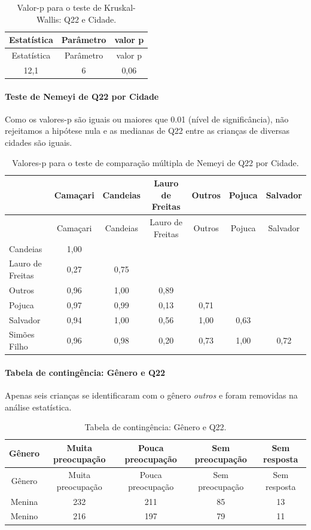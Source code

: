 \documentclass[]{article}
\let\oldparagraph\paragraph
\renewcommand{\paragraph}[1]{\oldparagraph{#1}\mbox{}}
\begin{document}
\begin{longtable}[]{@{}ccc@{}}
\caption{\label{tab:unnamed-chunk-491}Valor-p para o teste de Kruskal-Wallis: Q22 e Cidade.}\tabularnewline
\toprule
Estatística & Parâmetro & valor p\tabularnewline
\midrule
\endfirsthead
\toprule
Estatística & Parâmetro & valor p\tabularnewline
\midrule
\endhead
12,1 & 6 & 0,06\tabularnewline
\bottomrule
\end{longtable}

\hypertarget{teste-de-nemeyi-de-q22-por-cidade}{%
\paragraph{Teste de Nemeyi de Q22 por Cidade}\label{teste-de-nemeyi-de-q22-por-cidade}}

Como os valores-p são iguais ou maiores que 0.01 (nível de significância), não rejeitamos a hipótese nula e as medianas de Q22 entre as crianças de diversas cidades são iguais.

\begin{longtable}[]{@{}lcccccc@{}}
\caption{\label{tab:unnamed-chunk-493}Valores-p para o teste de comparação múltipla de Nemeyi de Q22 por Cidade.}\tabularnewline
\toprule
& Camaçari & Candeias & Lauro de Freitas & Outros & Pojuca & Salvador\tabularnewline
\midrule
\endfirsthead
\toprule
& Camaçari & Candeias & Lauro de Freitas & Outros & Pojuca & Salvador\tabularnewline
\midrule
\endhead
Candeias & 1,00 & & & & &\tabularnewline
Lauro de Freitas & 0,27 & 0,75 & & & &\tabularnewline
Outros & 0,96 & 1,00 & 0,89 & & &\tabularnewline
Pojuca & 0,97 & 0,99 & 0,13 & 0,71 & &\tabularnewline
Salvador & 0,94 & 1,00 & 0,56 & 1,00 & 0,63 &\tabularnewline
Simões Filho & 0,96 & 0,98 & 0,20 & 0,73 & 1,00 & 0,72\tabularnewline
\bottomrule
\end{longtable}

\cleardoublepage

\hypertarget{tabela-de-continguxeancia-guxeanero-e-q22}{%
\paragraph{Tabela de contingência: Gênero e Q22}\label{tabela-de-continguxeancia-guxeanero-e-q22}}

Apenas seis crianças se identificaram com o gênero \emph{outros} e foram removidas na análise estatística.

\begin{longtable}[]{@{}ccccc@{}}
\caption{\label{tab:unnamed-chunk-494}Tabela de contingência: Gênero e Q22.}\tabularnewline
\toprule
Gênero & Muita preocupação & Pouca preocupação & Sem preocupação & Sem resposta\tabularnewline
\midrule
\endfirsthead
\toprule
Gênero & Muita preocupação & Pouca preocupação & Sem preocupação & Sem resposta\tabularnewline
\midrule
\endhead
Menina & 232 & 211 & 85 & 13\tabularnewline
Menino & 216 & 197 & 79 & 11\tabularnewline
\bottomrule
\end{longtable}
\end{document}
